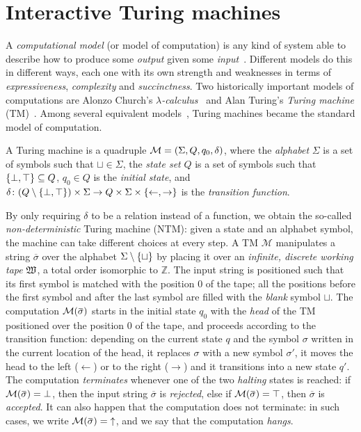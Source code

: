 \section{Interactive Turing machines}\label{sec:interactive_tm}
A \emph{computational model} (or model of computation) is any kind of system able to describe 
how to produce some \emph{output} given some \emph{input}~\cite{Savage1997}.
Different models do this in different ways, each one with its own strength and weaknesses in terms
of \emph{expressiveness}, \emph{complexity} and \emph{succinctness}.
Two historically important models of computations are Alonzo Church's 
\emph{\(\lambda \)-calculus}~\cite{Church1941} and Alan Turing's 
\emph{Turing machine} (TM)~\cite{Turing1950}. 
Among several equivalent models~\cite{Davis2004}, Turing machines became the standard model of 
computation.
\begin{definition}\label{def:turing_machine}
  A Turing machine is a quadruple \(\mathcal{M} = \Tuple{\Sigma, Q, q_0, \delta}\), where 
  the \emph{alphabet} \(\Sigma \) is a set of symbols such that \(\sqcup \in \Sigma \), the 
  \emph{state set} \(Q\) is a set of symbols such that \(\Set{\bot, \top} \subseteq Q\), 
  \(q_0 \in Q\) is the \emph{initial state}, and 
  \(\delta\colon {\Parens*{Q \setminus \Set{\bot, \top}} \times \Sigma} \to 
  {Q \times \Sigma \times \Set{\leftarrow, \rightarrow}}\) is the \emph{transition function}.
\end{definition}

By only requiring \(\delta \) to be a relation instead of a function, we obtain the so-called 
\emph{non-deterministic} Turing machine (NTM): given a state and an alphabet symbol, the machine 
can take different choices at every step.
A TM \(\mathcal{M}\) manipulates a string \(\overbar{\sigma}\) over the alphabet 
\(\Sigma \setminus \Set{\sqcup}\) by placing it over an \emph{infinite, discrete working tape} 
\(\Tapework \), a total order isomorphic to \(\mathbb{Z}\).
The input string is positioned such that its first symbol is matched with the position \(0\) 
of the tape; all the positions before the first symbol and after the last symbol are filled 
with the \emph{blank} symbol \(\sqcup \).
The computation \(\call{\mathcal{M}}{\overbar{\sigma}}\) starts in the initial state \(q_0\) with 
the \emph{head} of the TM positioned over the position \(0\) of the tape, and proceeds according to 
the transition function: depending on the current state \(q\) and the symbol \(\sigma \) written in 
the current location of the head, it replaces \(\sigma \) with a new symbol \(\sigma'\), it moves 
the head to the left (\(\leftarrow \)) or to the right (\(\rightarrow \)) and it transitions into a 
new state \(q'\).
The computation \emph{terminates} whenever one of the two \emph{halting} states is reached: if
\(\call{\mathcal{M}}{\overbar{\sigma}} = \bot \), then the input string \(\overbar{\sigma}\) is 
\emph{rejected}, else if \(\call{\mathcal{M}}{\overbar{\sigma}} = \top \), then \(\overbar{\sigma}\) 
is \emph{accepted}.
It can also happen that the computation does not terminate: in such cases, we write 
\(\call{\mathcal{M}}{\overbar{\sigma}} = {\uparrow}\), and we say that the computation \emph{hangs}.

